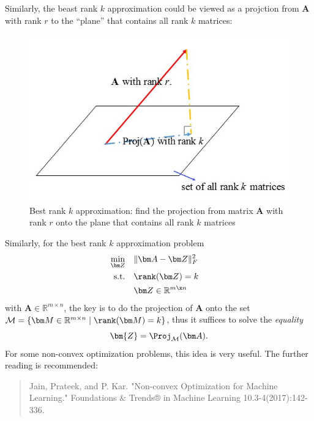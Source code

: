 Similarly, the beast rank $k$ approximation could be viewed as a projction from $\bm A$ with rank $r$ to the ``plane'' that contains all rank $k$ matrices:
\begin{figure}[H]
\centering\includegraphics{week7/rank_r}
\caption{Best rank $k$ approximation: find the projection from matrix $\bm A$ with rank $r$ onto the plane that contains all rank $k$ matrices}
\end{figure}
\begin{remark}
Similarly, for the best rank $k$ approximation problem
\begin{align*}
  \min_{\bm Z}\quad        & \|\bm A-\bm Z\|^2_{F} \\
  \text{s.t.\quad} &  \rank(\bm Z)=k &     \\
                   &\bm Z\in\mathbb{R}^{m\x n}
\end{align*}
with $\bm A\in\mathbb{R}^{m\times n}$, the key is to do the projection of $\bm A$ onto the set $\mathcal{M}=\{\bm M \in\mathbb{R}^{m\times n}\mid \rank(\bm M)=k\}$, thus it suffices to solve the \emph{equality}
\[
\bm{Z}=\Proj_{\mathcal{M}}(\bm A).
\]
For some non-convex optimization problems, this idea is very useful. The further reading is recommended:
\begin{quotation}
Jain, Prateek, and P. Kar. "Non-convex Optimization for Machine Learning." Foundations $\&$ Trends® in Machine Learning 10.3-4(2017):142-336.
\end{quotation}
\end{remark}
